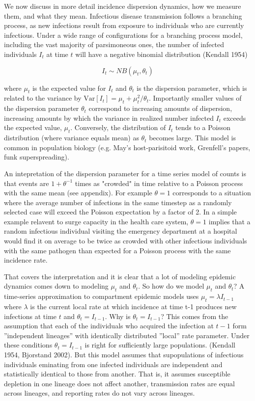 \documentclass[10pt,letterpaper]{article}
\begin{document}
We now discuss in more detail incidence dispersion dynamics, how we measure them, and what they mean.
Infectious disease transmission follows a branching process, as new infections result from exposure to individuals who are currently infectious. Under a wide range of configurations for a branching process model, including the vast majority of parsimoneous ones, the number of infected individuals $I_t$ at time $t$ will have a negative binomial distribution (Kendall 1954)

$$
I_t \sim NB \left( \mu_t, \theta_t \right)
$$

where $\mu_t$ is the expected value for $I_t$ and $\theta_t$ is the dispersion parameter, which is related to the variance by $\mathrm{Var}[I_t] = \mu_t + \mu_t^2 / \theta_t$. Importantly smaller values of the dispersion parameter $\theta_t$ correspond to increasing amounts of dispersion, increasing amounts by which the variance in realized number infected $I_t$ exceeds the expected value, $\mu_t$. Conversely, the distribution of $I_t$ tends to a Poisson distribution (where variance equals mean) as $\theta_t$ becomes large. This model is common in population biology (e.g. May's host-parisitoid work, Grenfell's papers, funk superspreading).

An intepretation of the dispersion parameter for a time series model of counts is that events are $1 + \theta^{-1}$ times as "crowded" in time relative to a Poisson process with the same mean \cite{lloyd_mean_1967} (see appendix). For example $\theta = 1$ corresponds to a situation where the average number of infections in the same timestep as a randomly selected case will exceed the Poisson expectation by a factor of 2. In a simple example relavent to surge capacity in the health care system, $\theta = 1$ implies that a random infectious individual visiting the emergency department at a hospital would find it on average to be twice as crowded with other infectious individuals with the same pathogen than expected for a Poisson process with the same incidence rate.

That covers the interpretation and it is clear that a lot of modeling epidemic dynamics comes down to modeling $\mu_t$ and $\theta_t$. So how do we model $\mu_t$ and $\theta_t$? A time-series approximation to compartment epidemic models uses $\mu_t = \lambda I_{t-1}$ where $\lambda$ is the current local rate at which incidence at time t-1 produces new infections at time $t$ and $\theta_t = I_{t-1}$. Why is $\theta_t = I_{t-1}$? This comes from the assumption that each of the individuals who acquired the infection at $t-1$ form ''independent lineages'' with identically distributed ''local'' rate parameter. Under these conditions $\theta_t = I_{t-1}$ is right for sufficiently large populations. (Kendall 1954, Bjorstand 2002). But this model assumes that supopulations of infectious individuals eminating from one infected individuals are independent and statistically identical to those from another. That is, it assumes susceptible depletion in one lineage does not affect another, transmission rates are equal across lineages, and reporting rates do not vary across lineages. 
\end{document}
